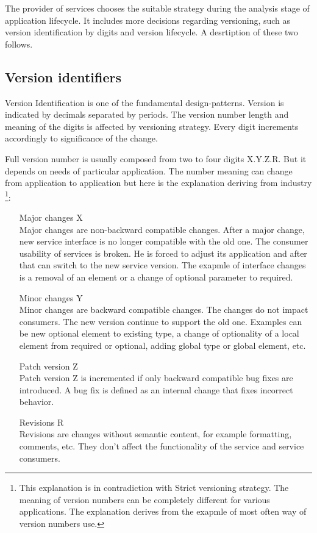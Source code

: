 The provider of services chooses the suitable strategy during the analysis stage of application lifecycle. It includes more decisions regarding versioning, such as version identification by digits and version lifecycle. A desrtiption of these two follows.

\subsection{Version identifiers}
\label{subsec:versionid}
Version Identification is one of the fundamental \gls{design-patterns}. Version is indicated by decimals separated by periods. The version number length and meaning of the digits is affected by versioning strategy. Every digit increments accordingly to significance of the change. 

Full version number is usually composed from two to four digits X.Y.Z.R. But it depends on needs of particular application. The number meaning can change from application to application but here is the explanation deriving from industry \cite{soa-governance} \footnote{This explanation is in contradiction with Strict versioning strategy. The meaning of version numbers can be completely different for various applications. The explanation derives from the exapmle of most often way of version numbers use.}:


\begin{enumerate}
  \item[Major changes X] \hfill \\
  Major changes are non-backward compatible changes. After a major change, new service interface is no longer compatible with the old one. The consumer usability of services is broken. He is forced to adjust its application and after that can switch to the new service version. The exapmle of interface changes is a removal of an element or a change of optional parameter to required.

    \item[Minor changes Y] \hfill \\
  Minor changes are backward compatible changes. The changes do not impact consumers. The new version continue to support the old one. Examples can be new optional element to existing type, a change of optionality of a local element from required or optional, adding global type or global element, etc.
  
  \item[Patch version Z] \hfill \\  
  Patch version Z is incremented if only backward compatible bug fixes are introduced. A bug fix is defined as an internal change that fixes incorrect behavior.
  
  \item[Revisions R] \hfill \\ 
  Revisions are changes without semantic content, for example formatting, comments, etc. They don't affect the functionality of the service and service consumers.
\end{enumerate} 

